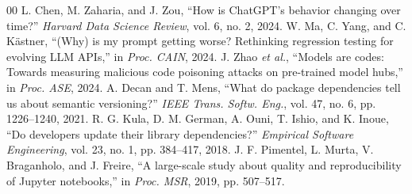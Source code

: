 \documentclass[conference]{IEEEtran}
\begin{document}
\begin{thebibliography}{00}
 L. Chen, M. Zaharia, and J. Zou, ``How is ChatGPT's behavior changing over time?'' \emph{Harvard Data Science Review}, vol. 6, no. 2, 2024.
 W. Ma, C. Yang, and C. K\"{a}stner, ``(Why) is my prompt getting worse? Rethinking regression testing for evolving LLM APIs,'' in \emph{Proc. CAIN}, 2024.
 J. Zhao \emph{et al.}, ``Models are codes: Towards measuring malicious code poisoning attacks on pre-trained model hubs,'' in \emph{Proc. ASE}, 2024.
 A. Decan and T. Mens, ``What do package dependencies tell us about semantic versioning?'' \emph{IEEE Trans. Softw. Eng.}, vol. 47, no. 6, pp. 1226--1240, 2021.
 R. G. Kula, D. M. German, A. Ouni, T. Ishio, and K. Inoue, ``Do developers update their library dependencies?'' \emph{Empirical Software Engineering}, vol. 23, no. 1, pp. 384--417, 2018.
 J. F. Pimentel, L. Murta, V. Braganholo, and J. Freire, ``A large-scale study about quality and reproducibility of Jupyter notebooks,'' in \emph{Proc. MSR}, 2019, pp. 507--517.
\end{thebibliography}
\end{document}
